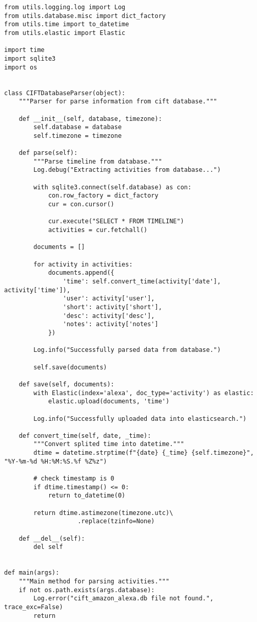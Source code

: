 \documentclass{easychair}
\begin{document}
\begin{enumerate}
\begin{lstlisting}
from utils.logging.log import Log
from utils.database.misc import dict_factory
from utils.time import to_datetime
from utils.elastic import Elastic

import time
import sqlite3
import os


class CIFTDatabaseParser(object):
    """Parser for parse information from cift database."""

    def __init__(self, database, timezone):
        self.database = database
        self.timezone = timezone

    def parse(self):
        """Parse timeline from database."""
        Log.debug("Extracting activities from database...")

        with sqlite3.connect(self.database) as con:
            con.row_factory = dict_factory
            cur = con.cursor()

            cur.execute("SELECT * FROM TIMELINE")
            activities = cur.fetchall()

        documents = []

        for activity in activities:
            documents.append({
                'time': self.convert_time(activity['date'], activity['time']),
                'user': activity['user'],
                'short': activity['short'],
                'desc': activity['desc'],
                'notes': activity['notes']
            })

        Log.info("Successfully parsed data from database.")

        self.save(documents)

    def save(self, documents):
        with Elastic(index='alexa', doc_type='activity') as elastic:
            elastic.upload(documents, 'time')

        Log.info("Successfully uploaded data into elasticsearch.")

    def convert_time(self, date, _time):
        """Convert splited time into datetime."""
        dtime = datetime.strptime(f"{date} {_time} {self.timezone}", "%Y-%m-%d %H:%M:%S.%f %Z%z")
        
        # check timestamp is 0
        if dtime.timestamp() <= 0:
            return to_datetime(0)

        return dtime.astimezone(timezone.utc)\
                    .replace(tzinfo=None)

    def __del__(self):
        del self


def main(args):
    """Main method for parsing activities."""
    if not os.path.exists(args.database):
        Log.error("cift_amazon_alexa.db file not found.", trace_exc=False)
        return


\end{lstlisting}
\end{enumerate}
\end{document}
